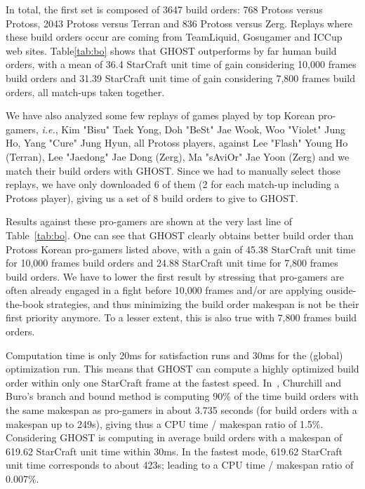 \documentclass[journal]{IEEEtran}
\newcommand{\ghost}{\textsc{GHOST}\xspace}
\newcommand{\ie}{\textit{i.e.}}
\begin{document}
In total, the first set is  composed of 3647 build orders: 768 Protoss
versus  Protoss, 2043  Protoss versus  Terran and  836 Protoss  versus
Zerg.   Replays  where  these  build  orders  occur  are  coming  from
TeamLiquid,  Gosugamer and  ICCup web  sites. Table\ref{tab:bo}  shows
that \ghost outperforms by far human build orders, with a mean of 36.4
StarCraft unit time of gain considering 10,000 frames build orders and
31.39  StarCraft unit  time  of gain  considering  7,800 frames  build
orders, all match-ups taken together. 

We have also  analyzed some few replays of games  played by top Korean
pro-gamers,  \ie, Kim  "Bisu"  Taek  Yong, Doh  "BeSt"  Jae Wook,  Woo
"Violet" Jung Ho, Yang "Cure"  Jung Hyun, all Protoss players, against
Lee  "Flash" Young  Ho (Terran),  Lee  "Jaedong" Jae  Dong (Zerg),  Ma
"sAviOr"  Jae  Yoon  (Zerg)  and  we match  their  build  orders  with
\ghost.  Since we  had to manually select those replays,  we have only
downloaded 6 of them (2 for each match-up including a Protoss player),
giving us a set of 8 build orders to give to \ghost.

Results against  these pro-gamers are shown  at the very last  line of
Table~\ref{tab:bo}.  One  can see  that \ghost clearly  obtains better
build order than  Protoss Korean pro-gamers listed above,  with a gain
of 45.38 StarCraft unit time for  10,000 frames build orders and 24.88
StarCraft unit  time for 7,800 frames  build orders. We have  to lower
the  first  result by  stressing  that  pro-gamers are  often  already
engaged  in  a   fight  before  10,000  frames   and/or  are  applying
ouside-the-book  strategies,  and  thus  minimizing  the  build  order
makespan is not  be their first priority anymore. To  a lesser extent,
this is also true with 7,800 frames build orders.

Computation time is  only 20ms for satisfaction runs and  30ms for the
(global) optimization run. This means that \ghost can compute a highly
optimized build order  within only one StarCraft frame  at the fastest
speed. In~\cite{ChurchillB11},  Churchill and Buro's branch  and bound
method  is computing  90\%  of the  time build  orders  with the  same
makespan as pro-gamers in about 3.735 seconds (for build orders with a
makespan up to 249s), giving thus a CPU time / makespan ratio of
1.5\%. Considering \ghost is computing  in average build orders with a
makespan of  619.62 StarCraft  unit time within  30ms. In  the fastest
mode, 619.62 StarCraft unit time corresponds to about 423s; leading to
a CPU time / makespan ratio of 0.007\%.
\end{document}

